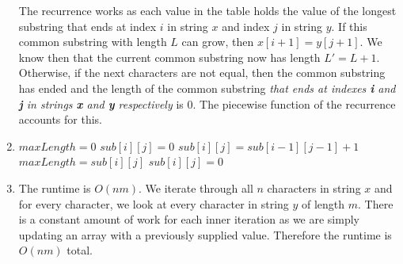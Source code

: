 \documentclass{article}
\begin{document}
\begin{enumerate}
        The recurrence works as each value in the table holds the value of the longest substring that ends at index $i$ in string $x$ and index $j$ in string $y$. If this common substring with length $L$ can grow,
        then $x[i+1] = y[j+1]$. We know then that the current common substring now has length $L' = L+1$. Otherwise, if the next characters are not equal, then the common substring has ended and the length
        of the common substring \emph{that ends at indexes \textbf{i} and \textbf{j} in strings \textbf{x} and \textbf{y} respectively} is $0$. The piecewise function of the recurrence accounts for this.
    \item 
        \begin{algorithmic}
                \State $maxLength = 0$
                            \State $sub[i][j] = 0$
                            \State $sub[i][j] = sub[i-1][j-1] + 1$
                                $maxLength = sub[i][j]$
                            \EndIf
                        \Else
                            \State $sub[i][j] = 0$
                        \EndIf
                    \EndFor
                \EndFor
            \EndFunction
        \end{algorithmic}
    \item The runtime is $O(nm)$. We iterate through all $n$ characters in string $x$ and for every character, we look at every character in string $y$ of length $m$.
            There is a constant amount of work for each inner iteration as we are simply updating an array with a previously supplied value. Therefore the runtime is $O(nm)$ total.

\end{enumerate}

\newpage
\end{document}
